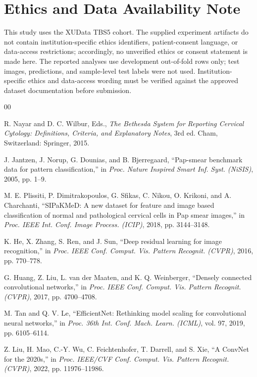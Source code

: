 \documentclass[conference]{IEEEtran}
\begin{document}
\section*{Ethics and Data Availability Note}
This study uses the XUData TBS5 cohort. The supplied experiment artifacts
do not contain institution-specific ethics identifiers, patient-consent
language, or data-access restrictions; accordingly, no unverified ethics
or consent statement is made here. The reported analyses use development
out-of-fold rows only; test images, predictions, and sample-level test
labels were not used. Institution-specific ethics and data-access wording
must be verified against the approved dataset documentation before
submission.

\FloatBarrier
\begin{thebibliography}{00}
\footnotesize
\setlength{\itemsep}{0pt}
\setlength{\parsep}{0pt}

R. Nayar and D. C. Wilbur, Eds., \emph{The Bethesda System for Reporting Cervical Cytology: Definitions, Criteria, and Explanatory Notes}, 3rd ed. Cham, Switzerland: Springer, 2015.

J. Jantzen, J. Norup, G. Dounias, and B. Bjerregaard, ``Pap-smear benchmark data for pattern classification,'' in \emph{Proc. Nature Inspired Smart Inf. Syst. (NiSIS)}, 2005, pp. 1--9.

M. E. Plissiti, P. Dimitrakopoulos, G. Sfikas, C. Nikou, O. Krikoni, and A. Charchanti, ``SIPaKMeD: A new dataset for feature and image based classification of normal and pathological cervical cells in Pap smear images,'' in \emph{Proc. IEEE Int. Conf. Image Process. (ICIP)}, 2018, pp. 3144--3148.

K. He, X. Zhang, S. Ren, and J. Sun, ``Deep residual learning for image recognition,'' in \emph{Proc. IEEE Conf. Comput. Vis. Pattern Recognit. (CVPR)}, 2016, pp. 770--778.

G. Huang, Z. Liu, L. van der Maaten, and K. Q. Weinberger, ``Densely connected convolutional networks,'' in \emph{Proc. IEEE Conf. Comput. Vis. Pattern Recognit. (CVPR)}, 2017, pp. 4700--4708.

M. Tan and Q. V. Le, ``EfficientNet: Rethinking model scaling for convolutional neural networks,'' in \emph{Proc. 36th Int. Conf. Mach. Learn. (ICML)}, vol. 97, 2019, pp. 6105--6114.

Z. Liu, H. Mao, C.-Y. Wu, C. Feichtenhofer, T. Darrell, and S. Xie, ``A ConvNet for the 2020s,'' in \emph{Proc. IEEE/CVF Conf. Comput. Vis. Pattern Recognit. (CVPR)}, 2022, pp. 11976--11986.


\end{thebibliography}
\end{document}
